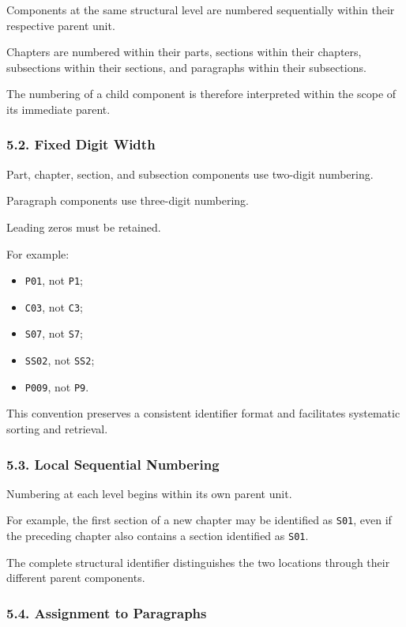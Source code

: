 Components at the same structural
level are numbered sequentially
within their respective parent unit.

Chapters are numbered within their
parts, sections within their chapters,
subsections within their sections,
and paragraphs within their
subsections.

The numbering of a child component
is therefore interpreted within
the scope of its immediate parent.

\subsubsection*{5.2. Fixed Digit Width}

Part, chapter, section, and subsection
components use two-digit numbering.

Paragraph components use three-digit
numbering.

Leading zeros must be retained.

For example:

\begin{itemize}
    \item \texttt{P01}, not \texttt{P1};
    \item \texttt{C03}, not \texttt{C3};
    \item \texttt{S07}, not \texttt{S7};
    \item \texttt{SS02}, not \texttt{SS2};
    \item \texttt{P009}, not \texttt{P9}.
\end{itemize}

This convention preserves a consistent
identifier format and facilitates
systematic sorting and retrieval.

\subsubsection*{5.3. Local Sequential Numbering}

Numbering at each level begins
within its own parent unit.

For example, the first section
of a new chapter may be identified
as \texttt{S01}, even if the preceding
chapter also contains a section
identified as \texttt{S01}.

The complete structural identifier
distinguishes the two locations
through their different parent
components.

\subsubsection*{5.4. Assignment to Paragraphs}

